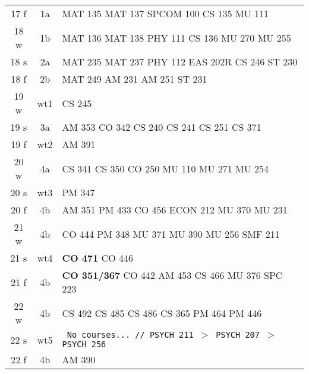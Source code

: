 \documentclass[convert]{standalone}
\begin{document}
\begin{tabular}{|c | c | l |}
	\hline
	17 f & 1a & MAT 135 \quad MAT 137 \quad SPCOM 100 \quad CS 135 \quad MU 111 \\
	18 w & 1b & MAT 136 \quad MAT 138 \quad PHY 111 \quad CS 136 \quad MU 270 \quad MU 255\\
	18 s & 2a & MAT 235 \quad MAT 237 \quad PHY 112 \quad EAS 202R \quad CS 246 \quad ST  230 \\
	18 f & 2b & MAT 249 \quad AM 231 \quad AM 251 \quad ST  231 \\
	19 w & wt1 & CS 245 \\
	19 s & 3a & AM 353 \quad CO 342 \quad CS 240 \quad CS 241 \quad CS 251 \quad CS 371 \\
	19 f & wt2 & AM 391 \\
	20 w & 4a & CS 341 \quad CS 350 \quad CO 250  \quad MU 110 \quad MU 271 \quad MU 254 \\
	20 s & wt3 & PM 347 \\
	20 f & 4b & AM 351  \quad PM 433  \quad CO 456 \quad ECON 212  \quad MU 370 \quad MU 231   \\
	21 w & 4b & CO 444 \quad PM 348   \quad MU 371   \quad MU 390 \quad MU 256 \quad SMF 211 \\
	21 s & wt4 & {\color{red}\textbf{CO 471}} \quad CO 446 \quad   \\
	21 f & 4b &{\color{white} \textbf{CO 351/367}} \quad CO 442  \quad AM 453 \quad CS 466 \quad MU 376 \quad SPC 223      \\
	22 w & 4b & CS 492  \quad CS 485 \quad CS 486 \quad CS 365 \quad PM 464 \quad PM 446     \\
	22 s & wt5 & {\tt  \color{gray} No courses... // PSYCH 211 $>$ PSYCH 207 $>$ PSYCH 256} \\
	22 f & 4b &  AM 390   \\\hline

\end{tabular}
\end{document}
